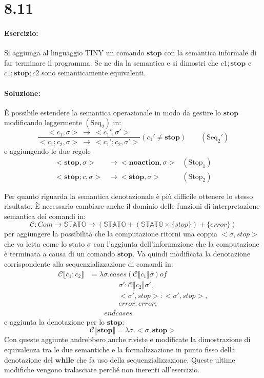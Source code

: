\documentclass[a4paper,twosides]{report}
\begin{document}
\section*{8.11}
\paragraph{Esercizio:} Si aggiunga al linguaggio TINY un comando $\mathbf{stop}$
con la semantica informale di far terminare il 
programma. Se ne dia la semantica e si dimostri che $c 1 ; \mathbf{stop}$ e $c 1 ;
\mathbf{stop}; c 2$ sono semanticamente
equivalenti.

\paragraph{Soluzione:}
\`E possibile estendere la semantica operazionale in modo da gestire
lo $\mathbf{stop}$ modificando leggermente $(\text{Seq}_2)$ in:
$$
\frac{<c_1,\sigma>\ \longrightarrow\ <c_1',\sigma'>}{<c_1;c_2,\sigma>\
  \longrightarrow\ <c_1';c_2,\sigma'>}(c_1'\neq\mathbf{stop})\qquad (\text{Seq}_2')
$$
e aggiungendo le due regole
\begin{align*}
<\mathbf{stop},\sigma>&\longrightarrow{} <\mathbf{noaction},\sigma>&(\text{Stop}_1)\\
<\mathbf{stop};c,\sigma>&\longrightarrow{} <\mathbf{stop},\sigma>&(\text{Stop}_2)
\end{align*}

Per quanto riguarda la semantica denotazionale \`e pi\`u difficile
ottenere lo stesso risultato. \`E necessario cambiare anche il dominio
delle funzioni di interpretazione semantica dei comandi in:
$$
\mathcal{C}: Com\longrightarrow{}\mathbb{STATO}\longrightarrow{}(\mathbb{STATO}+(\mathbb{STATO}\times\{stop\})+\{error\})
$$
per aggiungere la possibilit\`a che la computazione ritorni una coppia
$<\sigma,stop>$ che va letta come lo stato $\sigma$ con
l'aggiunta dell'informazione che la computazione \`e terminata a causa
di un comando $\mathbf{stop}$. Va quindi modificata la denotazione
corrispondente alla sequenzializzazione di comandi in:
\begin{align*}
  \mathcal{C}\llbracket c_1;c_2\rrbracket&= \lambda\sigma.cases (\mathcal{C}\llbracket c_1\rrbracket\sigma)
  of\\
&\qquad\qquad\sigma':\mathcal{C}\llbracket c_2\rrbracket\sigma',\\
&\qquad\qquad<\sigma',stop>:<\sigma',stop>,\\
&\qquad\qquad error : error;\\
&\qquad endcases
\end{align*}
e aggiunta la denotazione per lo $\mathbf{stop}$:
$$
\mathcal{C}\llbracket\mathbf{stop}\rrbracket=\lambda\sigma.<\sigma,\mathbf{stop}>
$$
Con queste aggiunte andrebbero anche riviste e  modificate la dimostrazione di
equivalenza tra le due semantiche e la formalizzazione in punto fisso della
denotazione del $\mathbf{while}$ che fa uso della
sequenzializzazione. Queste ultime modifiche vengono tralasciate
perch\'e non inerenti all'esercizio.
\end{document}
